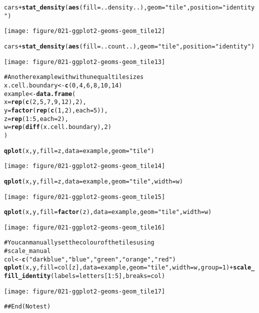 \documentclass[a4paper,titlepage]{tufte-handout}\usepackage{graphicx, color}
\makeatletter
\def\maxwidth{ %
  \ifdim\Gin@nat@width>\linewidth
    \linewidth
  \else
    \Gin@nat@width
  \fi
}
\newcommand{\hlfunctioncall}[1]{\textcolor[rgb]{0.501960784313725,0,0.329411764705882}{\textbf{#1}}}%
\newcommand{\hlstring}[1]{\textcolor[rgb]{0.6,0.6,1}{#1}}%
\newcommand{\hlcomment}[1]{\textcolor[rgb]{0.180392156862745,0.6,0.341176470588235}{#1}}%
\newenvironment{kframe}{%
 \def\at@end@of@kframe{}%
 \ifinner\ifhmode%
  \def\at@end@of@kframe{\end{minipage}}%
  \begin{minipage}{\columnwidth}%
 \fi\fi%
 \def\FrameCommand##1{\hskip\@totalleftmargin \hskip-\fboxsep
 \colorbox{shadecolor}{##1}\hskip-\fboxsep
     \hskip-\linewidth \hskip-\@totalleftmargin \hskip\columnwidth}%
 \MakeFramed {\advance\hsize-\width
   \@totalleftmargin\z@ \linewidth\hsize
   \@setminipage}}%
 {\par\unskip\endMakeFramed%
 \at@end@of@kframe}
\newenvironment{knitrout}{}{} %
\makeatother
\begin{document}
\begin{knitrout}
\begin{kframe}
\begin{alltt}
cars + \hlfunctioncall{stat_density}(\hlfunctioncall{aes}(fill=..density..), geom=\hlstring{"tile"}, position=\hlstring{"identity"})
\end{alltt}
\end{kframe}
\texttt{[image: figure/021-ggplot2-geoms-geom\_tile12]} 
\begin{kframe}\begin{alltt}
cars + \hlfunctioncall{stat_density}(\hlfunctioncall{aes}(fill=..count..), geom=\hlstring{"tile"}, position=\hlstring{"identity"})
\end{alltt}
\end{kframe}
\texttt{[image: figure/021-ggplot2-geoms-geom\_tile13]} 
\begin{kframe}\begin{alltt}

\hlcomment{# Another example with with unequal tile sizes}
x.cell.boundary <- \hlfunctioncall{c}(0, 4, 6, 8, 10, 14)
example <- \hlfunctioncall{data.frame}(
  x = \hlfunctioncall{rep}(\hlfunctioncall{c}(2, 5, 7, 9, 12), 2),
  y = \hlfunctioncall{factor}(\hlfunctioncall{rep}(\hlfunctioncall{c}(1,2), each=5)),
  z = \hlfunctioncall{rep}(1:5, each=2),
  w = \hlfunctioncall{rep}(\hlfunctioncall{diff}(x.cell.boundary), 2)
)

\hlfunctioncall{qplot}(x, y, fill=z, data=example, geom=\hlstring{"tile"})
\end{alltt}
\end{kframe}
\texttt{[image: figure/021-ggplot2-geoms-geom\_tile14]} 
\begin{kframe}\begin{alltt}
\hlfunctioncall{qplot}(x, y, fill=z, data=example, geom=\hlstring{"tile"}, width=w)
\end{alltt}
\end{kframe}
\texttt{[image: figure/021-ggplot2-geoms-geom\_tile15]} 
\begin{kframe}\begin{alltt}
\hlfunctioncall{qplot}(x, y, fill=\hlfunctioncall{factor}(z), data=example, geom=\hlstring{"tile"}, width=w)
\end{alltt}
\end{kframe}
\texttt{[image: figure/021-ggplot2-geoms-geom\_tile16]} 
\begin{kframe}\begin{alltt}

\hlcomment{# You can manually set the colour of the tiles using}
\hlcomment{# scale_manual}
col <- \hlfunctioncall{c}(\hlstring{"darkblue"}, \hlstring{"blue"}, \hlstring{"green"}, \hlstring{"orange"}, \hlstring{"red"})
\hlfunctioncall{qplot}(x, y, fill=col[z], data=example, geom=\hlstring{"tile"}, width=w, group=1) + \hlfunctioncall{scale_fill_identity}(labels=letters[1:5], breaks=col)
\end{alltt}
\end{kframe}
\texttt{[image: figure/021-ggplot2-geoms-geom\_tile17]} 
\begin{kframe}\begin{alltt}
\hlcomment{## End(No test)}



\end{alltt}
\end{kframe}
\end{knitrout}
\end{document}
